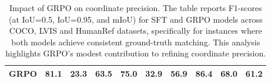\begin{table}[t]
{\begin{tabular}{c|ccc|ccc|ccc}
GRPO                   & 81.1                                                 & 23.3                                                  & 63.5                                                  & 75.0                                                 & 32.9                                                  & 56.9                                                  & 86.4                                                 & 68.0                                                  & 61.2                                                 \\ \hline
\end{tabular}
    }
    \centering
    \caption{Impact of GRPO on coordinate precision. The table reports F1-scores (at IoU=0.5, IoU=0.95, and mIoU) for SFT and GRPO models across COCO, LVIS and HumanRef datasets, specifically for instances where both models achieve consistent ground-truth matching. This analysis highlights GRPO's modest contribution to refining coordinate precision.}
\label{tab:ab3_coordinate_accuracy}
\end{table}